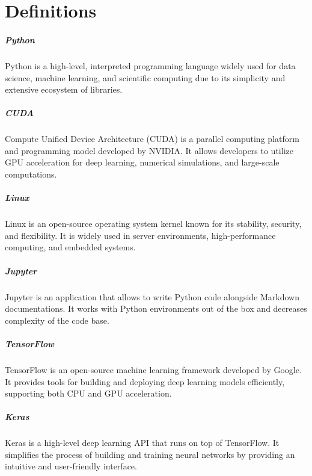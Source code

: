 \chapter{Definitions}
\label{chap:definitions}
\setlength{\parskip}{1em}

\paragraph{Python} Python is a high-level, interpreted programming language widely used for data science, machine learning, and scientific computing due to its simplicity and extensive ecosystem of libraries.

\paragraph{CUDA} Compute Unified Device Architecture (CUDA) is a parallel computing platform and programming model developed by NVIDIA. It allows developers to utilize GPU acceleration for deep learning, numerical simulations, and large-scale computations.

\paragraph{Linux} Linux is an open-source operating system kernel known for its stability, security, and flexibility. It is widely used in server environments, high-performance computing, and embedded systems.

\paragraph{Jupyter} Jupyter is an application that allows to write Python code alongside Markdown documentations. It works with Python environments out of the box and decreases complexity of the code base.

\paragraph{TensorFlow} TensorFlow is an open-source machine learning framework developed by Google. It provides tools for building and deploying deep learning models efficiently, supporting both CPU and GPU acceleration.

\paragraph{Keras} Keras is a high-level deep learning API that runs on top of TensorFlow. It simplifies the process of building and training neural networks by providing an intuitive and user-friendly interface.

